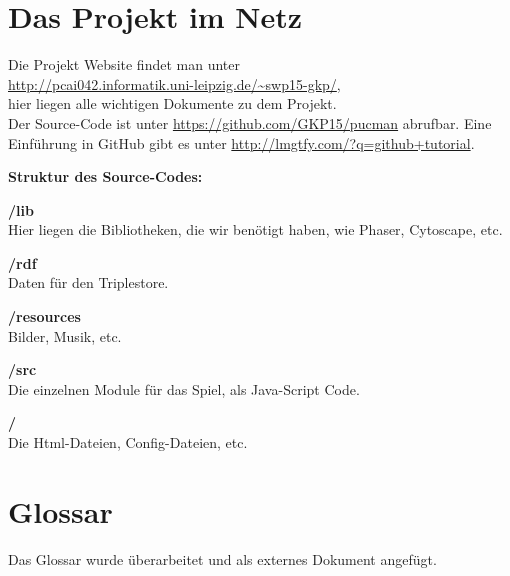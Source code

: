 \documentclass[11pt,a4paper]{article}
\begin{document}
\section{Das Projekt im Netz}
Die Projekt Website findet man unter \\ \url{http://pcai042.informatik.uni-leipzig.de/~swp15-gkp/}, \\ hier liegen alle wichtigen Dokumente zu dem Projekt.\\
Der Source-Code ist unter \url{https://github.com/GKP15/pucman} abrufbar. Eine Einführung in GitHub gibt es unter \url{http://lmgtfy.com/?q=github+tutorial}.
 \par\bigskip
{\flushleft \textbf{Struktur des Source-Codes:}} \par\bigskip
{\flushleft \textbf{/lib}} \\
Hier liegen die Bibliotheken, die wir benötigt haben, wie Phaser, Cytoscape, etc. \par\bigskip
{\flushleft \textbf{/rdf}} \\
Daten für den Triplestore. \par\bigskip
{\flushleft \textbf{/resources}} \\
Bilder, Musik, etc. \par\bigskip
{\flushleft \textbf{/src}} \\
Die einzelnen Module für das Spiel, als Java-Script Code. \par\bigskip
{\flushleft \textbf{/}} \\
Die Html-Dateien, Config-Dateien, etc.  



\section{Glossar}
Das Glossar wurde überarbeitet und als externes Dokument angefügt.
\end{document}
